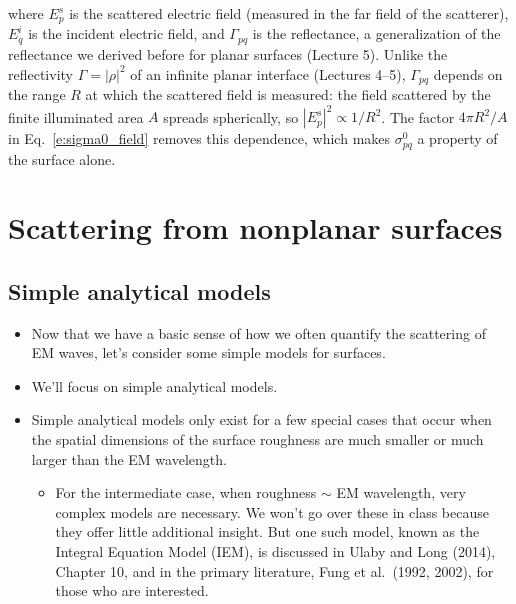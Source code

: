 \documentclass[11pt, oneside]{article}
\begin{document}
\begin{itemize}
\begin{equation}
	\end{equation}
	where $E_p^s$ is the scattered electric field (measured in the far field of the scatterer), $E_q^i$ is the incident electric field, and $\Gamma_{pq}$ is the reflectance, a generalization of the reflectance we derived before for planar surfaces (Lecture 5).
	Unlike the reflectivity $\Gamma = |\rho|^2$ of an infinite planar interface (Lectures 4--5), $\Gamma_{pq}$ depends on the range $R$ at which the scattered field is measured: the field scattered by the finite illuminated area $A$ spreads spherically, so $|E_p^s|^2 \propto 1/R^2$. The factor $4\pi R^2/A$ in Eq.~\eqref{e:sigma0_field} removes this dependence, which makes $\sigma_{pq}^0$ a property of the surface alone.
\end{itemize}

\section{Scattering from nonplanar surfaces}
\label{s:nonplanar}

\subsection{Simple analytical models}

\begin{itemize}
	\item Now that we have a basic sense of how we often quantify the scattering of EM waves, let's consider some simple models for surfaces.
	\item We'll focus on simple analytical models.
	\item Simple analytical models only exist for a few special cases that occur when the spatial dimensions of the surface roughness are much smaller or much larger than the EM wavelength.
	\begin{itemize}
		\item[$\hookrightarrow$] For the intermediate case, when roughness $\sim$ EM wavelength, very complex models are necessary. We won't go over these in class because they offer little additional insight. But one such model, known as the Integral Equation Model (IEM), is discussed in Ulaby and Long (2014), Chapter 10, and in the primary literature, Fung et al.\ (1992, 2002), for those who are interested.
	\end{itemize}
\end{itemize}
\end{document}
